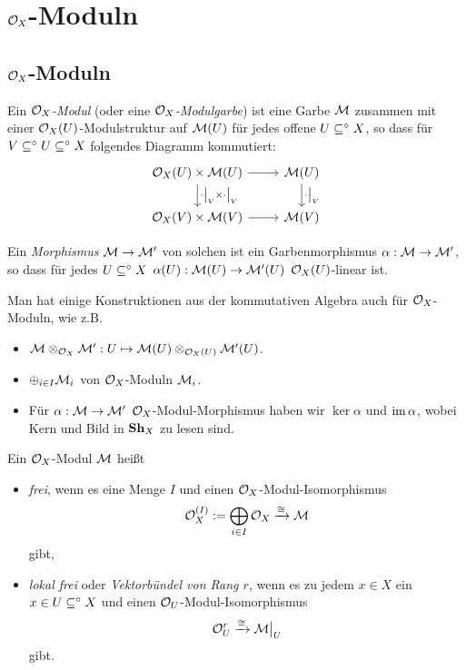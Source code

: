 \section{$\mathcal{O}_X$-Moduln}
\newcommand{\OX}{$\O_X$-}

\subsection{$\mathcal{O}_X$-Moduln}
\begin{definition}[$\mathcal{O}_X$-Modul]
    Ein \emph{$\mathcal{O}_X$-Modul} (oder eine \emph{$\mathcal{O}_X$-Modulgarbe}) ist eine 
    Garbe $\mathcal{M}$ zusammen mit einer $\mathcal{O}_X(U)$-Modulstruktur auf $\mathcal{M}(U)$
    für jedes offene $U\subseteq^\circ X$, so dass für 
    $V \subseteq^\circ U \subseteq^\circ X$ folgendes Diagramm kommutiert:
    \[\begin{tikzcd}
        \O_X(U) \times \M(U) \rar \dar{\cdot\rest V \times \cdot \rest V}
        & \M(U) \dar{\cdot \rest V}\\
        \O_X(V) \times \M(V) \rar & \M(V)
    \end{tikzcd}\]
    
    Ein \emph{Morphismus} $\mathcal{M} \to \mathcal{M}'$ von solchen ist ein Garbenmorphismus
    $\alpha: \mathcal{M}\to \mathcal{M}'$, so dass für jedes $U\subseteq^\circ X$ 
    $\alpha(U):\mathcal{M}(U) \to \mathcal{M}'(U)$ $\mathcal{O}_X(U)$-linear ist.
\end{definition}


\begin{bemerkung}
    Man hat einige Konstruktionen aus der kommutativen Algebra auch für
    $\mathcal{O}_X$-Moduln, wie z.B.
    \begin{itemize}
      \item $\mathcal{M} \otimes_{\mathcal{O}_X} \mathcal{M}': U \mapsto \mathcal{M}(U) \otimes_{\mathcal{O}_X(U)} \mathcal{M}'(U)$.
      \item $\oplus_{i\in I} \mathcal{M}_i$ von $\mathcal{O}_X$-Moduln $\mathcal{M}_i$.
      \item Für $\alpha:\mathcal{M}\to \mathcal{M}'$ $\mathcal{O}_X$-Modul-Morphismus haben wir
        $\ker \alpha$ und $\operatorname{im} \alpha$,
        wobei Kern und Bild in $\mathbf{Sh}_X$ zu lesen sind.
    \end{itemize}
\end{bemerkung}


\begin{definition}
    Ein \OX Modul $\mathcal{M}$ heißt
    \begin{itemize}
      \item \emph{frei}, wenn es eine Menge $I$ und einen 
        \OX Modul-Isomorphismus 
        \[ \mathcal{O}_X^{(I)} := \bigoplus_{i\in I} \mathcal{O}_X \xrightarrow{\cong} \mathcal{M}\]
        gibt,
      \item \emph{lokal frei} oder \emph{Vektorbündel von Rang $r$}, 
        wenn es zu jedem $x\in X$ ein $x \in U\subseteq^\circ X$ und einen
        $\mathcal{O}_U$-Modul-Isomorphismus
        \[ \mathcal{O}_U^r \xrightarrow{\cong} \mathcal{M}\big|_{U}\]
        gibt.
    \end{itemize}
\end{definition}

